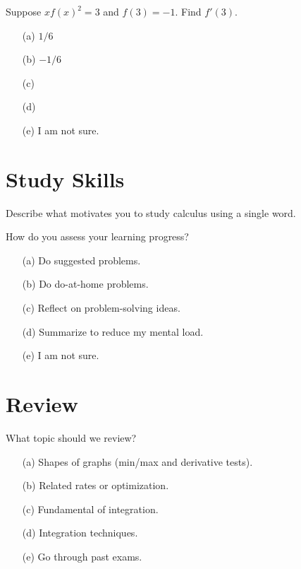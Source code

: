 \documentclass[14pt]{beamer}
\begin{document}
\begin{frame}[t]
  Suppose \(x f(x)^{2} = 3\) and \(f(3) = -1\). Find \(f'(3)\).

  \medskip
  \begin{itemize} \setlength\itemsep{2ex}
    \item[(a)] \(1/6\)
    \item[(b)] \(-1/6\)
    \item[(c)]
    \item[(d)]
    \item[(e)] I am not sure.
  \end{itemize}
\end{frame}

\section{Study Skills}
\begin{frame}
  Describe what motivates you to study calculus using a single word.
\end{frame}

\begin{frame}
  How do you assess your learning progress?

  \medskip
  \begin{itemize} \setlength\itemsep{2ex}
    \item[(a)] Do suggested problems.
    \item[(b)] Do do-at-home problems.
    \item[(c)] Reflect on problem-solving ideas.
    \item[(d)] Summarize to reduce my mental load.
    \item[(e)] I am not sure.
  \end{itemize} 
\end{frame}


\section{Review}
\begin{frame}
  What topic should we review?

  \medskip
  \begin{itemize} \setlength\itemsep{2ex}
    \item[(a)] Shapes of graphs (min/max and derivative tests).
    \item[(b)] Related rates or optimization.
    \item[(c)] Fundamental of integration.
    \item[(d)] Integration techniques.
    \item[(e)] Go through past exams.
  \end{itemize} 
\end{frame}

%
%
\end{document}
